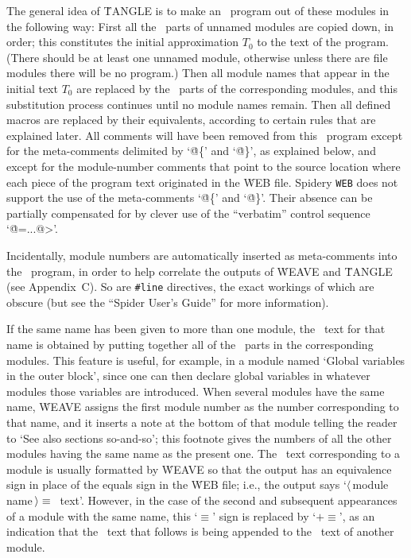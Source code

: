 The general idea of \.{TANGLE} is to make an \PASCAL\ program out of these
modules in the following way: First all the \PASCAL\ parts of unnamed
modules are copied down, in order; this constitutes the initial
approximation $T_0$ to the text of the program.
(There should be at least
one unnamed module, otherwise 
\newstuff unless there are file modules \endnewstuff
there will be no program.) Then all module
names that appear in the initial text $T_0$ are replaced by the \PASCAL\
parts of the corresponding modules, and this substitution process
continues until no module names remain.
Then all defined macros are
replaced by their equivalents, according to certain rules that are
explained later.
All comments will have been removed from this \PASCAL\
program except for the meta-comments delimited by `\.{@\{}' and
`\.{@\}}', as explained below, and except for the module-number comments
that point to the source location where each piece of the program text
originated in the \.{WEB} file.
\newstuff
Spidery {\tt WEB} does not support the use of the meta-comments 
 `\.{@\{}' and `\.{@\}}'.
Their absence can be partially compensated for by clever use of the
``verbatim'' control sequence `\.{@=...@>}'.
\endnewstuff

Incidentally, module numbers are automatically inserted
as meta-comments into the \PASCAL\ program, in order to help correlate the
outputs of \.{WEAVE} and \.{TANGLE} (see Appendix~C\null).
\newstuff So are {\tt\#line} directives, the exact workings of which
are obscure (but see the ``{Spider} User's Guide'' for more information).
\endnewstuff

If the same name has been given to more than one module, the \PASCAL\ text
for that name is obtained by putting together all of the \PASCAL\ parts in
the corresponding modules.
This feature is useful, for example, in a
module named `Global variables in the outer block', since one can then
declare global variables in whatever modules those variables are
introduced.
When several modules have the same name, \.{WEAVE} assigns the
first module number as the number corresponding to that name, and it
inserts a note at the bottom of that module telling the reader to `See
also sections so-and-so'; this footnote gives the numbers of all the other
modules having the same name as the present one.
The \PASCAL\ text
corresponding to a module is usually formatted by \.{WEAVE} so that the
output has an equivalence sign in place of the equals sign in the \.{WEB}
file; i.e., the output says `$\langle\,$module
name$\,\rangle\equiv\null$\PASCAL\ text'.
However, in the case of the second
and subsequent appearances of a module with the same name, this `$\equiv$'
sign is replaced by `$\mathrel+\equiv$', as an indication that the \PASCAL\
text that follows is being appended to the \PASCAL\ text of another
module.


